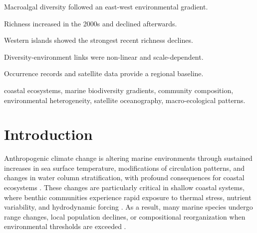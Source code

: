 \documentclass[a4paper,fleqn]{cas-sc}
\begin{document}
\begin{highlights}
\item Macroalgal diversity followed an east-west environmental gradient.
\item Richness increased in the 2000s and declined afterwards.
\item Western islands showed the strongest recent richness declines.
\item Diversity-environment links were non-linear and scale-dependent.
\item Occurrence records and satellite data provide a regional baseline.
\end{highlights}

\begin{keywords} coastal ecosystems, marine biodiversity gradients, community composition, environmental heterogeneity, satellite oceanography, macro-ecological patterns.
\end{keywords}

\maketitle

\section{Introduction}
Anthropogenic climate change is altering marine environments through sustained increases in sea surface temperature, modifications of circulation patterns, and changes in water column stratification, with profound consequences for coastal ecosystems \citep{SANGIL2012, Doneyetal2012, ANI202, Huang2024}. These changes are particularly critical in shallow coastal systems, where benthic communities experience rapid exposure to thermal stress, nutrient variability, and hydrodynamic forcing \citep{Noissetteetal2022}. As a result, many marine species undergo range changes, local population declines, or compositional reorganization when environmental thresholds are exceeded \citep{Belsega2013, Assan2020, Gianluigietal2021}.
\end{document}

